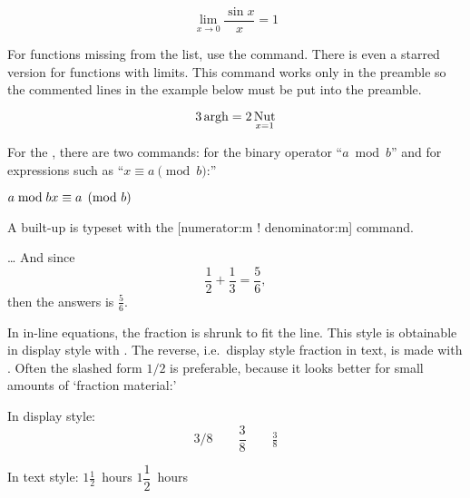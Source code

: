 \begin{example}
\begin{equation*}
  \lim_{x \rightarrow 0}
  \frac{\sin x}{x}=1
\end{equation*}
\end{example}

For functions missing from the list, use the 
command. There is even a starred version for functions with limits.
This command works only in the preamble so the commented lines in the
example below must be put into the preamble.

\begin{example}
\begin{equation*}
  3\operatorname{argh} = 2\operatorname*{Nut}_{x=1}    
\end{equation*}
\end{example}

For the , there are two commands:  for the
binary operator ``$a \bmod b$'' and 
for expressions
such as ``$x\equiv a \pmod{b}$:''
\begin{example}
$a\bmod b \\
 x\equiv a \pmod{b}$
\end{example}

A built-up \emph{} is typeset with the
[numerator:m ! denominator:m]%
command.
\begin{example}
\ldots{} And since
\begin{equation*}
  \frac{1}{2} 
  + \frac{1}{3}
  = \frac{5}{6},
\end{equation*}
then the answers is
$\frac{5}{6}$.
\end{example}

In in-line equations, the fraction is shrunk to
fit the line. This style is obtainable in display style with . The
reverse, i.e.\ display style fraction in text, is made with .
Often the slashed form $1/2$ is preferable, because it looks better
for small amounts of `fraction material:'
\begin{example}
In display style:
\begin{equation*}
  3/8 \qquad \frac{3}{8} 
  \qquad \tfrac{3}{8}
\end{equation*}
\end{example}

\begin{example}
In text style:
$1\frac{1}{2}$~hours \qquad
$1\dfrac{1}{2}$~hours
\end{example}

